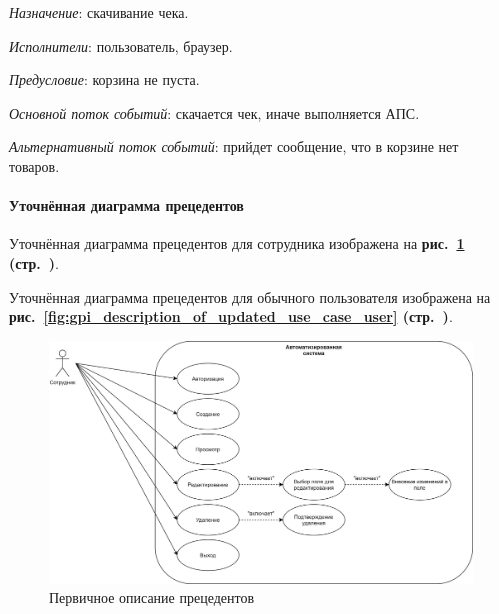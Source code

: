 \textit{Назначение}: скачивание чека.

\textit{Исполнители}: пользователь, браузер.

\textit{Предусловие}: корзина не пуста.

\textit{Основной поток событий}: скачается чек, иначе выполняется АПС.

\textit{Альтернативный поток событий}: прийдет сообщение, что в корзине нет товаров.


\paragraph{Уточнённая диаграмма прецедентов} \hspace{0pt}

Уточнённая диаграмма прецедентов для сотрудника изображена
на \textbf{рис.~\ref{fig:gpi_description_of_updated_use_case_employee} (стр.~\pageref{fig:gpi_description_of_updated_use_case_employee})}.

Уточнённая диаграмма прецедентов для обычного пользователя изображена
на \textbf{рис.~\ref{fig:gpi_description_of_updated_use_case_user} (стр.~\pageref{fig:gpi_description_of_updated_use_case_user})}.

\begin{figure}[!p]
    \centering
    \includegraphics[width=14cm]
        {_assets/gpi_description_of_updated_use_case_employee.png}
    \caption{Первичное описание прецедентов}
    \label{fig:gpi_description_of_updated_use_case_employee}
\end{figure}

